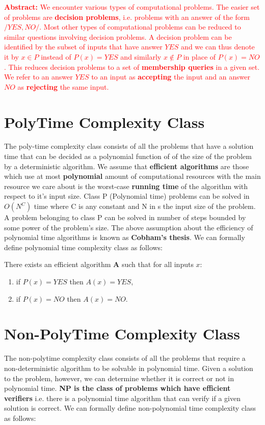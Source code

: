 \textcolor{red}{\textbf{Abstract:} We encounter various types of computational problems. The easier set of problems are \textbf{decision problems}, i.e. problems with an answer of the form $/{YES, NO/}$. Most other types of computational problems can be reduced to similar questions involving decision problems. A decision problem can be identified by the subset of inputs that have answer $YES$ and we can thus denote it by $x \in P$ instead of $P(x) = YES$ and similarly $x \notin P$ in place of $P(x) = NO$. This reduces decision problems to a set of \textbf{membership queries} in a given set. We refer to an answer $YES$ to an input as \textbf{accepting} the input and an answer $NO$ as \textbf{rejecting} the same input.}
\section{PolyTime Complexity Class}
 The poly-time complexity class consists of all the problems that have  a solution time that can be decided as  a polynomial function of of the size of the problem by a deterministic algorithm. We assume that \textbf{efficient algorithms} are those which use at most \textbf{polynomial} amount of computational resources with the main resource we care about is the worst-case \textbf{running time} of the algorithm with respect to it's input size. Class P (Polynomial time) problems can be solved in $O(N^C)$ time where C is any constant and N in s the input size of the problem. A problem belonging to class P can be solved in number of steps bounded by some power of the problem's size. The above assumption about the efficiency of polynomial time algorithms is known as \textbf{Cobham's thesis}. We can formally define polynomial time complexity class as follows:
 
 There exists an efficient algorithm $\textbf{A}$ such that for all inputs $x$:
 \begin{enumerate}[nolistsep]
     \item if $P(x) = YES$ then $A(x) = YES$,
     \item if $P(x) = NO$ then $A(x) = NO$.
 \end{enumerate}
 
 \section{Non-PolyTime Complexity Class}
 The non-polytime complexity class consists of all the problems that require a non-deterministic algorithm to be solvable in polynomial time. Given a solution to the problem, however, we can determine whether it is correct or not in polynomial time. \textbf{NP is the class of problems which have efficient verifiers} i.e. there is a polynomial time algorithm that can verify if a given solution is correct. We can formally define non-polynomial time complexity class as follows:
 
